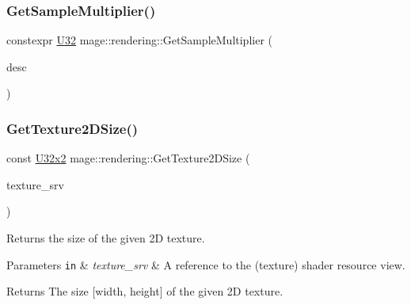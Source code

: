 \mbox{\label{namespacemage_1_1rendering_a8974628b18f5bb28f8f7c570998872d5}} 
\subsubsection{\texorpdfstring{Get\+Sample\+Multiplier()}{GetSampleMultiplier()}}
{\footnotesize\ttfamily constexpr \mbox{\hyperlink{namespacemage_aa5d6eaabaac3cdd01873d6a3d27e90f3}{U32}} mage\+::rendering\+::\+Get\+Sample\+Multiplier (\begin{DoxyParamCaption}\item[{\mbox{\hyperlink{namespacemage_1_1rendering_ac3f75e49e92b42f2f5fb55c450d8899c}{Anti\+Aliasing}}}]{desc }\end{DoxyParamCaption})\hspace{0.3cm}{\ttfamily [noexcept]}}

\mbox{\label{namespacemage_1_1rendering_ac4021886dd6be0385ba158152bb00557}} 
\subsubsection{\texorpdfstring{Get\+Texture2\+D\+Size()}{GetTexture2DSize()}\hspace{0.1cm}{\footnotesize\ttfamily [1/2]}}
{\footnotesize\ttfamily const \mbox{\hyperlink{namespacemage_ae5e7ccf8a1785baaacf57b3a0f4324e2}{U32x2}} mage\+::rendering\+::\+Get\+Texture2\+D\+Size (\begin{DoxyParamCaption}\item[{I\+D3\+D11\+Shader\+Resource\+View \&}]{texture\+\_\+srv }\end{DoxyParamCaption})}

Returns the size of the given 2D texture.


\begin{DoxyParams}[1]{Parameters}
\mbox{\tt in}  & {\em texture\+\_\+srv} & A reference to the (texture) shader resource view. \\
\hline
\end{DoxyParams}
\begin{DoxyReturn}{Returns}
The size \mbox{[}width, height\mbox{]} of the given 2D texture. 
\end{DoxyReturn}

